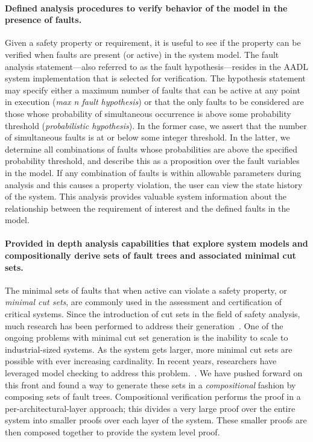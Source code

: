 \paragraph{Defined analysis procedures to verify behavior of the model in the presence of faults.}
Given a safety property or requirement, it is useful to see if the property can be verified when faults are present (or active) in the system model. The fault analysis statement---also referred to as the fault hypothesis---resides in the AADL system implementation that is selected for verification. The hypothesis statement may specify either a maximum number of faults that can be active at any point in execution (\emph{max n fault hypothesis}) or that the only faults to be considered are those whose probability of simultaneous occurrence is above some probability threshold (\emph{probabilistic hypothesis}).  In the former case, we assert that the number of simultaneous faults is at or below some integer threshold.  In the latter, we determine all combinations of faults whose probabilities are above the specified probability threshold, and describe this as a proposition over the fault variables in the model. If any combination of faults is within allowable parameters during analysis and this causes a property violation, the user can view the state history of the system. This analysis provides valuable system information about the relationship between the requirement of interest and the defined faults in the model. 

\paragraph{Provided in depth analysis capabilities that explore system models and compositionally derive sets of fault trees and associated minimal cut sets.}
The minimal sets of faults that when active can violate a safety property, or {\em minimal cut sets}, are commonly used in the assessment and certification of critical systems. Since the introduction of cut sets in the field of safety analysis, much research has been performed to address their generation~\cite{fta:survey,rauzy1993new,historyFTA,Bozzano:2010:DSA:1951720,rausand2003system}. One of the ongoing problems with minimal cut set generation is the inability to scale to industrial-sized systems. As the system gets larger, more minimal cut sets are possible with ever increasing cardinality. In recent years, researchers have leveraged model checking to address this problem.~\cite{bieber2002combination,schafer2003combining,fta:survey,contractBasedDesign,symbFTA,DBLP:conf/cav/BozzanoCPJKPRT15}. We have pushed forward on this front and found a way to generate these sets in a \emph{compositional} fashion by composing sets of fault trees. Compositional verification performs the proof in a per-architectural-layer approach; this divides a very large proof over the entire system into smaller proofs over each layer of the system. These smaller proofs are then composed together to provide the system level proof. 

